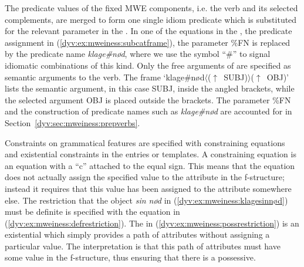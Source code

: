 \documentclass[output=paper]{langsci/langscibook}
\begin{document}


The predicate values of the fixed MWE components, i.e. the verb and its selected complements, are merged to form one single idiom predicate which is substituted for the relevant parameter in the .
In one of the equations in the , the predicate assignment in (\ref{dyv:ex:mweiness:subcatframe}),  the parameter \%FN is replaced by the predicate name \emph{klage\#nød}, where we use the symbol ``\#'' to signal idiomatic combinations of this kind.
Only the free arguments of  are specified as semantic arguments to the verb.
The  frame `klage\#nød$\langle$($\uparrow$~SUBJ)$\rangle$($\uparrow$~OBJ)' lists the semantic argument, in this case SUBJ, inside the angled brackets, while the selected argument OBJ is placed outside the brackets.
The parameter \%FN and the construction of predicate names such as \emph{klage\#nød} are accounted for in Section~\ref{dyv:sec:mweiness:prepverbs}.  


Constraints on grammatical features are specified with constraining equations and existential constraints in the entries or templates.
A constraining equation is an equation with a ``c'' attached to the equal sign.
This means that the equation does not actually assign the specified value to the attribute in the f-structure; instead it requires that this value has been assigned to the attribute somewhere else.
The restriction that the object \emph{sin nød} in (\ref{dyv:ex:mweiness:klagesinnød}) must be definite is specified with the equation in (\ref{dyv:ex:mweiness:defrestriction}).
The  in (\ref{dyv:ex:mweiness:possrestriction}) is an existential  which simply provides  a path of attributes without assigning a particular value.
The interpretation is that this path of attributes must have some value in the f-structure, thus ensuring that there is a possessive.
\end{document}
